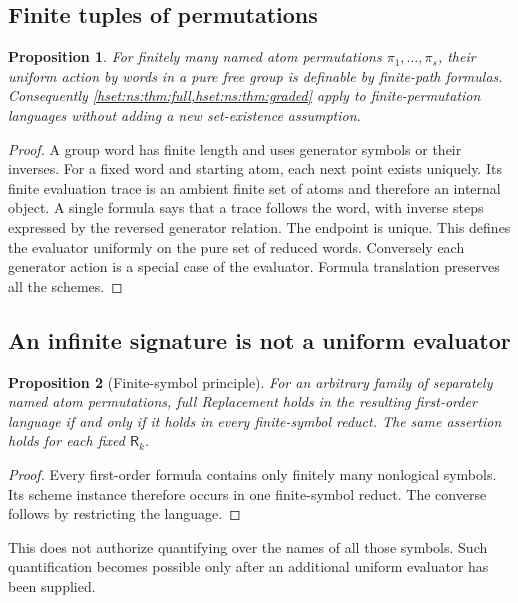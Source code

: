 \documentclass[11pt,letterpaper]{article}
\newtheorem{proposition}[proposition]{Proposition}\aliascntresetthe{proposition}
\theoremstyle{definition}
\theoremstyle{remark}
\begin{document}
\subsection{Finite tuples of permutations}
\begin{proposition}\label{hset:ns:prop:finitewords}
For finitely many named atom permutations $\pi_1,\ldots,\pi_s$, their uniform action by words in a pure free group is definable by finite-path formulas. Consequently \cref{hset:ns:thm:full,hset:ns:thm:graded} apply to finite-permutation languages without adding a new set-existence assumption.
\end{proposition}
\begin{proof}
A group word has finite length and uses generator symbols or their inverses. For a fixed word and starting atom, each next point exists uniquely. Its finite evaluation trace is an ambient finite set of atoms and therefore an internal object. A single formula says that a trace follows the word, with inverse steps expressed by the reversed generator relation. The endpoint is unique. This defines the evaluator uniformly on the pure set of reduced words. Conversely each generator action is a special case of the evaluator. Formula translation preserves all the schemes.
\end{proof}

\subsection{An infinite signature is not a uniform evaluator}
\begin{proposition}[Finite-symbol principle]\label{hset:ns:prop:language}
For an arbitrary family of separately named atom permutations, full Replacement holds in the resulting first-order language if and only if it holds in every finite-symbol reduct. The same assertion holds for each fixed $\mathsf R_k$.
\end{proposition}
\begin{proof}
Every first-order formula contains only finitely many nonlogical symbols. Its scheme instance therefore occurs in one finite-symbol reduct. The converse follows by restricting the language.
\end{proof}

This does not authorize quantifying over the names of all those symbols. Such quantification becomes possible only after an additional uniform evaluator has been supplied.
\end{document}
